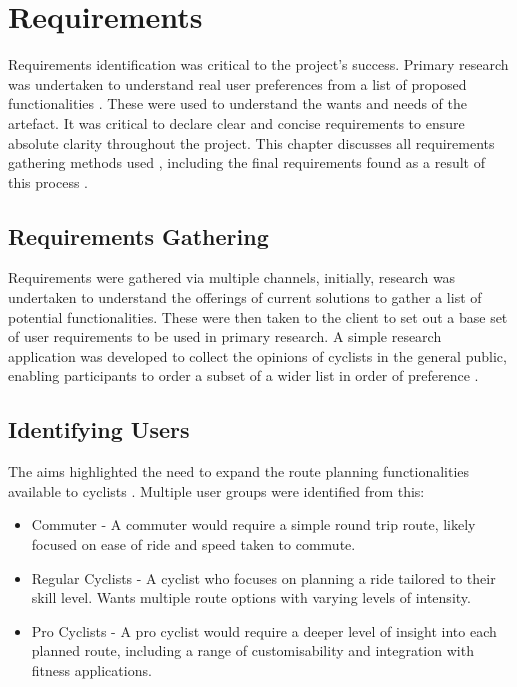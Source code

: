 \chapter{Requirements}
\label{chap:requirements}

Requirements identification was critical to the project's success. Primary research was undertaken to understand real user preferences from a list of proposed functionalities . These were used to understand the wants and needs of the artefact. It was critical to declare clear and concise requirements to ensure absolute clarity throughout the project. This chapter discusses all requirements gathering methods used , including the final requirements found as a result of this process .

\section{Requirements Gathering}
\label{requirements:gathering}

Requirements were gathered via multiple channels, initially, research was undertaken to understand the offerings of current solutions to gather a list of potential functionalities. These were then taken to the client to set out a base set of user requirements to be used in primary research. A simple research application was developed to collect the opinions of cyclists in the general public, enabling participants to order a subset of a wider list in order of preference .

\section{Identifying Users}
\label{requirements:identifyingusers} 
The aims highlighted the need to expand the route planning functionalities available to cyclists . Multiple user groups were identified from this:
\begin{itemize}
  \item Commuter - A commuter would require a simple round trip route, likely focused on ease of ride and speed taken to commute.
  \item Regular Cyclists - A cyclist who focuses on planning a ride tailored to their skill level. Wants multiple route options with varying levels of intensity.
  \item Pro Cyclists - A pro cyclist would require a deeper level of insight into each planned route, including a range of customisability and integration with fitness applications.
\end{itemize}


